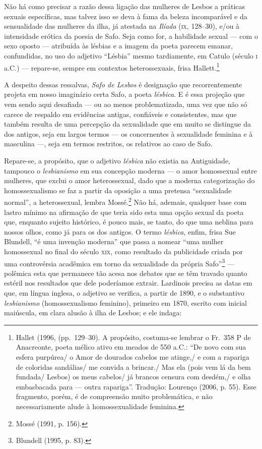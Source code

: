Não há como precisar a razão dessa ligação das mulheres de Lesbos a práticas
sexuais específicas, mas talvez isso se deva à fama da beleza incomparável e da
sensualidade das mulheres da ilha, já atestada na \textit{Ilíada} (\textsc{ix}, 128--30),
e/ou à intensidade erótica da poesia de Safo. Seja como for, a habilidade
sexual --- com o sexo oposto --- atribuída às lésbias e a imagem da poeta parecem
emanar, confundidas, no uso do adjetivo “Lésbia” mesmo tardiamente, em Catulo
(século \textsc{i} a.C.) --- repare-se, sempre em contextos heterossexuais, frisa Hallett.\footnote{ Hallet 
(1996, (pp.~129--30). A propósito, costuma-se lembrar o Fr.~358 P de
Anacreonte, poeta mélico ativo em meados de 550 a.C.: ``De novo
com sua esfera purpúrea/ o Amor de dourados cabelos me
atinge,/ e com a rapariga de coloridas sandálias/ me convida a
brincar./ Mas ela (pois vem lá da bem fundada/ Lesbos) os meus cabelos/ já
brancos censura com desdém,/ e olha embasbacada para --- outra rapariga''.
Tradução: Lourenço (2006, p. 55). Esse fragmento, porém, é de compreensão muito
problemática, e não necessariamente alude à homossexualidade feminina.} 

A despeito dessas ressalvas, \textit{Safo de Lesbos} é designação que
recorrentemente projeta em nosso imaginário certa Safo, a poeta
\textit{lésbica}. E é essa projeção que vem sendo aqui desafiada --- ou ao menos
problematizada, uma vez que não só carece de respaldo em evidências antigas,
confiáveis e consistentes, mas que também resulta de uma percepção da
sexualidade que em muito se distingue da dos antigos, seja em largos termos ---
os concernentes à sexualidade feminina e à masculina ---, seja em termos
restritos, os relativos ao caso de Safo. 

Repare-se, a propósito, que o adjetivo \textit{lésbica} não existia na
Antiguidade, tampouco o \textit{lesbianismo} em sua concepção moderna --- o amor
homossexual entre mulheres, que exclui o amor heterossexual, dado que a moderna
categorização do homossexualismo se faz a partir da oposição a uma pretensa
“sexualidade normal”, a heterossexual, lembra Mossé.\footnote{ Mossé (1991, p. 156).} Não há,
ademais, qualquer base com lastro mínimo na afirmação de que teria sido esta
uma opção sexual da poeta que, enquanto sujeito histórico, é pouco mais, se
tanto, do que uma neblina para nossos olhos, como já para os dos antigos. O
termo \textit{lésbica}, enfim, frisa Sue Blundell, “é uma
invenção moderna” que passa a nomear “uma mulher homossexual no final do século
\textsc{xix}, como resultado da publicidade criada por uma controvérsia acadêmica em
torno da sexualidade da própria Safo”\footnote{ Blundell (1995, p. 83).} --- polêmica esta que permanece tão acesa
nos debates que se têm travado quanto estéril nos resultados que dele
poderíamos extrair. Lardinois precisa as datas em que, em
língua inglesa, o adjetivo se verifica, a partir de 1890, e o substantivo
\textit{lesbianismo} (homossexualismo feminino), primeiro em 1870, escrito com
inicial maiúscula, em clara alusão à ilha de Lesbos; e ele indaga:

